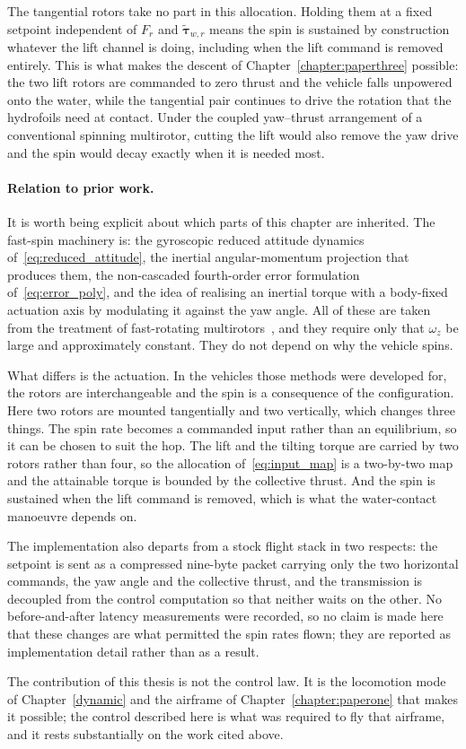 The tangential rotors take no part in this allocation.  Holding them at a
fixed setpoint independent of $F_r$ and $\tilde{\boldsymbol{\tau}}_{w,r}$
means the spin is sustained by construction whatever the lift channel is doing, including when the lift command is removed entirely.  This is what
makes the descent of Chapter~\ref{chapter:paperthree} possible: the two lift
rotors are commanded to zero thrust and the vehicle falls unpowered onto
the water, while the tangential pair continues to drive the rotation that the
hydrofoils need at contact.  Under the coupled yaw--thrust arrangement of a
conventional spinning multirotor, cutting the lift would also remove the yaw
drive and the spin would decay exactly when it is needed most.
\paragraph{Relation to prior work.}
It is worth being explicit about which parts of this chapter are inherited.
The fast-spin machinery is: the gyroscopic reduced attitude dynamics
of~\eqref{eq:reduced_attitude}, the inertial angular-momentum projection that
produces them, the non-cascaded fourth-order error formulation
of~\eqref{eq:error_poly}, and the idea of realising an inertial torque with a
body-fixed actuation axis by modulating it against the yaw angle.  All of
these are taken from the treatment of fast-rotating
multirotors~\cite{bai2020splitflyer,bai2022splitflyerair,mueller2016relaxed},
and they require only that $\omega_z$ be large and approximately constant.
They do not depend on why the vehicle spins.

What differs is the actuation.  In the vehicles those methods were developed
for, the rotors are interchangeable and the spin is a consequence of the
configuration.  Here two rotors are mounted tangentially and two vertically,
which changes three things.  The spin rate becomes a commanded input rather
than an equilibrium, so it can be chosen to suit the hop.  The lift and the
tilting torque are carried by two rotors rather than four, so the allocation
of~\eqref{eq:input_map} is a two-by-two map and the attainable torque
is bounded by the collective thrust.  And the spin is sustained when the lift
command is removed, which is what the water-contact manoeuvre depends on.

The implementation also departs from a stock flight stack in two respects: the
setpoint is sent as a compressed nine-byte packet carrying only the two
horizontal commands, the yaw angle and the collective thrust, and the
transmission is decoupled from the control computation so that neither waits
on the other.  No before-and-after latency measurements were recorded, so no
claim is made here that these changes are what permitted the spin rates flown;
they are reported as implementation detail rather than as a result.

The contribution of this thesis is not the control law.  It is the locomotion
mode of Chapter~\ref{dynamic} and the airframe of
Chapter~\ref{chapter:paperone} that makes it possible; the control described
here is what was required to fly that airframe, and it rests substantially on
the work cited above.
